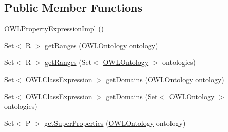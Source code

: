 \subsection*{Public Member Functions}
\begin{DoxyCompactItemize}
\item 
\hyperlink{classuk_1_1ac_1_1manchester_1_1cs_1_1owl_1_1owlapi_1_1_o_w_l_property_expression_impl_3_01_r_01e672e5abee4203a562fc61711ec3f6ded_a01e88c69852c245a466d262b8ed1d1ec}{O\-W\-L\-Property\-Expression\-Impl} ()
\item 
Set$<$ R $>$ \hyperlink{classuk_1_1ac_1_1manchester_1_1cs_1_1owl_1_1owlapi_1_1_o_w_l_property_expression_impl_3_01_r_01e672e5abee4203a562fc61711ec3f6ded_a624cd2c941fc33c3ba0b1b787d113d04}{get\-Ranges} (\hyperlink{interfaceorg_1_1semanticweb_1_1owlapi_1_1model_1_1_o_w_l_ontology}{O\-W\-L\-Ontology} ontology)
\item 
Set$<$ R $>$ \hyperlink{classuk_1_1ac_1_1manchester_1_1cs_1_1owl_1_1owlapi_1_1_o_w_l_property_expression_impl_3_01_r_01e672e5abee4203a562fc61711ec3f6ded_ad707776e1988e77ecc5031c3399be965}{get\-Ranges} (Set$<$ \hyperlink{interfaceorg_1_1semanticweb_1_1owlapi_1_1model_1_1_o_w_l_ontology}{O\-W\-L\-Ontology} $>$ ontologies)
\item 
Set$<$ \hyperlink{interfaceorg_1_1semanticweb_1_1owlapi_1_1model_1_1_o_w_l_class_expression}{O\-W\-L\-Class\-Expression} $>$ \hyperlink{classuk_1_1ac_1_1manchester_1_1cs_1_1owl_1_1owlapi_1_1_o_w_l_property_expression_impl_3_01_r_01e672e5abee4203a562fc61711ec3f6ded_a0f4e5005afb90350e70a8cd99316060b}{get\-Domains} (\hyperlink{interfaceorg_1_1semanticweb_1_1owlapi_1_1model_1_1_o_w_l_ontology}{O\-W\-L\-Ontology} ontology)
\item 
Set$<$ \hyperlink{interfaceorg_1_1semanticweb_1_1owlapi_1_1model_1_1_o_w_l_class_expression}{O\-W\-L\-Class\-Expression} $>$ \hyperlink{classuk_1_1ac_1_1manchester_1_1cs_1_1owl_1_1owlapi_1_1_o_w_l_property_expression_impl_3_01_r_01e672e5abee4203a562fc61711ec3f6ded_ab225e3f5dbfabb0ef47845a9970faaf9}{get\-Domains} (Set$<$ \hyperlink{interfaceorg_1_1semanticweb_1_1owlapi_1_1model_1_1_o_w_l_ontology}{O\-W\-L\-Ontology} $>$ ontologies)
\item 
Set$<$ P $>$ \hyperlink{classuk_1_1ac_1_1manchester_1_1cs_1_1owl_1_1owlapi_1_1_o_w_l_property_expression_impl_3_01_r_01e672e5abee4203a562fc61711ec3f6ded_a995a44286f6a7a2f3d5fad10b0acfccc}{get\-Super\-Properties} (\hyperlink{interfaceorg_1_1semanticweb_1_1owlapi_1_1model_1_1_o_w_l_ontology}{O\-W\-L\-Ontology} ontology)
\item 

\end{DoxyCompactItemize}
